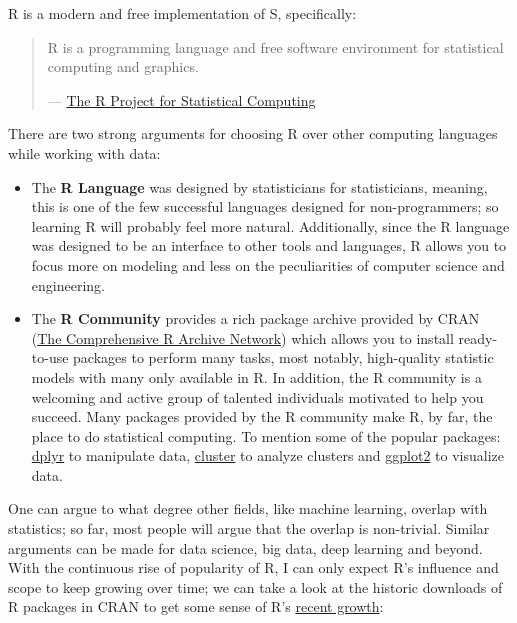 \documentclass[]{book}
\providecommand{\tightlist}{%
  \setlength{\itemsep}{0pt}\setlength{\parskip}{0pt}}
\theoremstyle{definition}
\theoremstyle{definition}
\theoremstyle{definition}
\theoremstyle{remark}
\begin{document}
R is a modern and free implementation of S, specifically:

\begin{quote}
R is a programming language and free software environment for
statistical computing and graphics.

--- \href{https://www.r-project.org/}{The R Project for Statistical
Computing}
\end{quote}

There are two strong arguments for choosing R over other computing
languages while working with data:

\begin{itemize}
\tightlist
\item
  The \textbf{R Language} was designed by statisticians for
  statisticians, meaning, this is one of the few successful languages
  designed for non-programmers; so learning R will probably feel more
  natural. Additionally, since the R language was designed to be an
  interface to other tools and languages, R allows you to focus more on
  modeling and less on the peculiarities of computer science and
  engineering.
\item
  The \textbf{R Community} provides a rich package archive provided by
  CRAN (\href{https://cran.r-project.org/}{The Comprehensive R Archive
  Network}) which allows you to install ready-to-use packages to perform
  many tasks, most notably, high-quality statistic models with many only
  available in R. In addition, the R community is a welcoming and active
  group of talented individuals motivated to help you succeed. Many
  packages provided by the R community make R, by far, the place to do
  statistical computing. To mention some of the popular packages:
  \href{https://CRAN.R-project.org/package=dplyr}{dplyr} to manipulate
  data, \href{https://CRAN.R-project.org/package=cluster}{cluster} to
  analyze clusters and
  \href{https://CRAN.R-project.org/package=ggplot2}{ggplot2} to
  visualize data.
\end{itemize}

One can argue to what degree other fields, like machine learning,
overlap with statistics; so far, most people will argue that the overlap
is non-trivial. Similar arguments can be made for data science, big
data, deep learning and beyond. With the continuous rise of popularity
of R, I can only expect R's influence and scope to keep growing over
time; we can take a look at the historic downloads of R packages in CRAN
to get some sense of R's \protect\hyperlink{cran-downloads}{recent
growth}:
\end{document}
